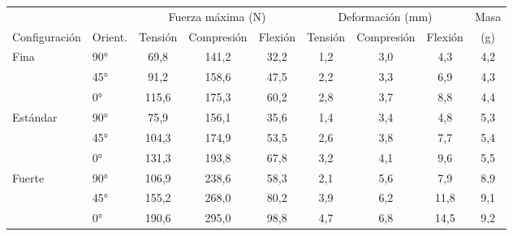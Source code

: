\begin{tabular}{@{}llccccccc@{}}\toprule
 & & \multicolumn{3}{c}{Fuerza máxima (N)} & \multicolumn{3}{c}{Deformación (mm)} & Masa \\
\cmidrule(lr){3-5}\cmidrule(lr){6-8}
Configuración & Orient. & Tensión & Compresión & Flexión & Tensión & Compresión & Flexión & (g) \\\midrule
Fina & 90° & 69{,}8 & 141{,}2 & 32{,}2 & 1{,}2 & 3{,}0 & 4{,}3 & 4{,}2 \\
 & 45° & 91{,}2 & 158{,}6 & 47{,}5 & 2{,}2 & 3{,}3 & 6{,}9 & 4{,}3 \\
 & 0° & 115{,}6 & 175{,}3 & 60{,}2 & 2{,}8 & 3{,}7 & 8{,}8 & 4{,}4 \\
\midrule
Estándar & 90° & 75{,}9 & 156{,}1 & 35{,}6 & 1{,}4 & 3{,}4 & 4{,}8 & 5{,}3 \\
 & 45° & 104{,}3 & 174{,}9 & 53{,}5 & 2{,}6 & 3{,}8 & 7{,}7 & 5{,}4 \\
 & 0° & 131{,}3 & 193{,}8 & 67{,}8 & 3{,}2 & 4{,}1 & 9{,}6 & 5{,}5 \\
\midrule
Fuerte & 90° & 106{,}9 & 238{,}6 & 58{,}3 & 2{,}1 & 5{,}6 & 7{,}9 & 8{,}9 \\
 & 45° & 155{,}2 & 268{,}0 & 80{,}2 & 3{,}9 & 6{,}2 & 11{,}8 & 9{,}1 \\
 & 0° & 190{,}6 & 295{,}0 & 98{,}8 & 4{,}7 & 6{,}8 & 14{,}5 & 9{,}2 \\
\bottomrule
\end{tabular}

